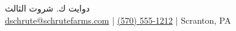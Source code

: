 \begin{center}
	{\Huge \scshape {دوايت ك. شروت الثالث}}\\
	\foreignlanguage{english}{\href{mailto:dschrute@schrutefarms.com}{dschrute@schrutefarms.com} | \href{tel:(570) 555-1212}{(570) 555-1212} | Scranton, PA\\}
\end{center}